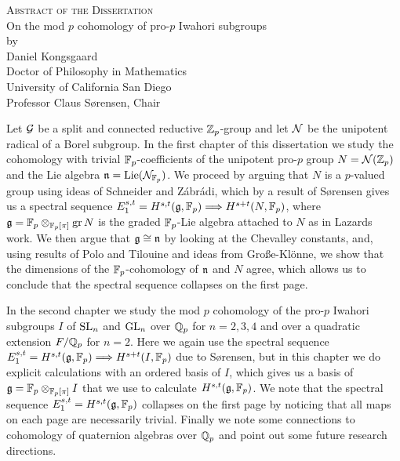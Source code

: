 \documentclass[letterpaper,oneside,english,11pt,openany]{memoir}
\begin{document}
\vspace*{1in}

\begin{center}
  {\Large\scshape Abstract of the Dissertation}\\[1.5em]
  {\large On the mod \texorpdfstring{$p$}{p} cohomology of pro-\texorpdfstring{$p$}{p} Iwahori subgroups}\\[1.5em]
  by \\[1.5em]
  Daniel Kongsgaard \\[1em]
  Doctor of Philosophy in Mathematics \\[1em]
  University of California San Diego \\[1.5em]
  Professor Claus Sørensen, Chair \\[2em]
\end{center}

Let $\mathcal{G}$ be a split and connected reductive $\mathbb{Z}_{p}$-group and let $\mathcal{N}$ be the unipotent radical of a Borel subgroup. In the first chapter of this dissertation we study the cohomology with trivial $\mathbb{F}_{p}$-coefficients of the unipotent pro-$p$ group $N = \mathcal{N}(\mathbb{Z}_{p})$ and the Lie algebra $\mathfrak{n} = \operatorname{Lie}(\mathcal{N}_{\mathbb{F}_{p}})$. We proceed by arguing that $N$ is a $p$-valued group using ideas of Schneider and Zábrádi, which by a result of Sørensen gives us a spectral sequence $E_{1}^{s,t} = H^{s,t}(\mathfrak{g},\mathbb{F}_{p}) \Longrightarrow H^{s+t}(N,\mathbb{F}_{p})$, where $\mathfrak{g} = \mathbb{F}_{p} \otimes_{\mathbb{F}_{p}[\pi]} \operatorname{gr} N$ is the graded $\mathbb{F}_{p}$-Lie algebra attached to $N$ as in Lazards work. We then argue that $\mathfrak{g} \cong \mathfrak{n}$ by looking at the Chevalley constants, and, using results of Polo and Tilouine and ideas from Große-Klönne, we show that the dimensions of the $\mathbb{F}_{p}$-cohomology of $\mathfrak{n}$ and $N$ agree, which allows us to conclude that the spectral sequence collapses on the first page.

In the second chapter we study the mod $p$ cohomology of the pro-$p$ Iwahori subgroups $I$ of $\operatorname{SL}_{n}$ and $\operatorname{GL}_{n}$ over $\mathbb{Q}_{p}$ for $n=2,3,4$ and over a quadratic extension $F/\mathbb{Q}_{p}$ for $n=2$. Here we again use the spectral sequence $E_{1}^{s,t} = H^{s,t}(\mathfrak{g},\mathbb{F}_{p}) \Longrightarrow H^{s+t}(I,\mathbb{F}_{p})$ due to Sørensen, but in this chapter we do explicit calculations with an ordered basis of $I$, which gives us a basis of $\mathfrak{g} = \mathbb{F}_{p} \otimes_{\mathbb{F}_{p}[\pi]} I$ that we use to calculate $H^{s,t}(\mathfrak{g},\mathbb{F}_{p})$. We note that the spectral sequence $E_{1}^{s,t} = H^{s,t}(\mathfrak{g},\mathbb{F}_{p})$ collapses on the first page by noticing that all maps on each page are necessarily trivial. Finally we note some connections to cohomology of quaternion algebras over $\mathbb{Q}_{p}$ and point out some future research directions.
\end{document}
